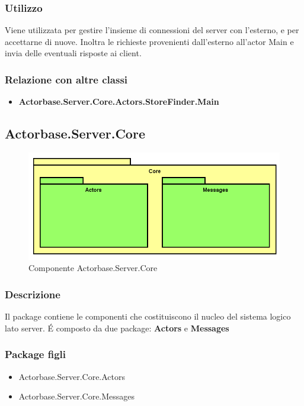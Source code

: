 \documentclass[a4paper]{article}
\begin{document}
			\subsubsection{Utilizzo}
				Viene utilizzata per gestire l'insieme di connessioni del server con l'esterno, e per accettarne di nuove. Inoltra le richieste provenienti dall'esterno all'actor Main e invia delle eventuali risposte ai client.
			\subsubsection{Relazione con altre classi}
			\begin{itemize}
				\item \textbf{Actorbase.Server.Core.Actors.StoreFinder.Main} 
			\end{itemize}
			
		\subsection{Actorbase.Server.Core}
			\begin{figure} [H]
			\centering
			\includegraphics[scale=0.55]{Server/Package/CoreLevel.png}
			\caption{Componente Actorbase.Server.Core}
			\end{figure}
			\subsubsection{Descrizione}
				Il package contiene le componenti che costituiscono il nucleo del sistema logico lato server. \'E composto da due package: \textbf{Actors} e \textbf{Messages}
			\subsubsection{Package figli}
			\begin{itemize}
				\item Actorbase.Server.Core.Actors
				\item Actorbase.Server.Core.Messages
			\end{itemize}
			
\end{document}
